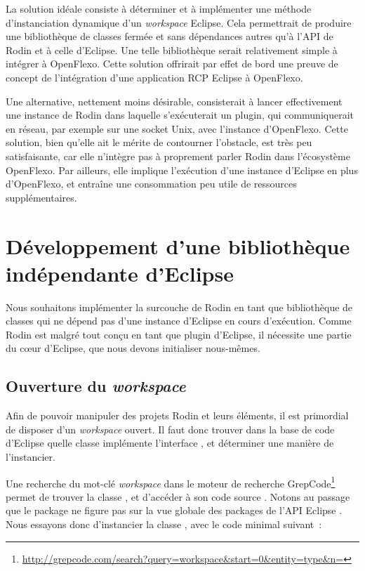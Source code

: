 La solution idéale consiste à déterminer et à implémenter une méthode d'instanciation dynamique d'un \textit{workspace} Eclipse.
Cela permettrait de produire une bibliothèque de classes fermée et sans dépendances autres qu'à l'API de Rodin et à celle d'Eclipse.
Une telle bibliothèque serait relativement simple à intégrer à OpenFlexo.
Cette solution offrirait par effet de bord une preuve de concept de l'intégration d'une application RCP Eclipse à OpenFlexo.

Une alternative, nettement moins désirable, consisterait à lancer effectivement une instance de Rodin dans laquelle s'exécuterait un plugin, qui communiquerait %
en réseau, par exemple sur une socket Unix, avec l'instance d'OpenFlexo.
Cette solution, bien qu'elle ait le mérite de contourner l'obstacle, est très peu satisfaisante, car elle n'intègre pas à proprement parler Rodin dans l'écosystème OpenFlexo.
Par ailleurs, elle implique l'exécution d'une instance d'Eclipse en plus d'OpenFlexo, et entraîne une consommation peu utile de ressources supplémentaires.


\section{Développement d'une bibliothèque indépendante d'Eclipse}

Nous souhaitons implémenter la surcouche de Rodin en tant que bibliothèque de classes qui ne dépend pas d'une instance d'Eclipse en cours d'exécution.
Comme Rodin est malgré tout conçu en tant que plugin d'Eclipse, il nécessite une partie du cœur d'Eclipse, que nous devons initialiser nous-mêmes.

\subsection{Ouverture du \textit{workspace}}

Afin de pouvoir manipuler des projets Rodin et leurs éléments, il est primordial de disposer d'un \textit{workspace} ouvert.
Il faut donc trouver dans la base de code d'Eclipse quelle classe implémente l'interface , et déterminer une manière de l'instancier.

Une recherche du mot-clé \textit{workspace} dans le moteur de recherche GrepCode\footnote{%
\url{http://grepcode.com/search?query=workspace&start=0&entity=type&n=}} %
permet de trouver la classe , et d'accéder à son code source \cite{eclipseworkspace}.
Notons au passage que le package  ne figure pas sur la vue globale des packages de l'API Eclipse \cite{eclipseapioverview}.
Nous essayons donc d'instancier la classe , avec le code minimal suivant~:

